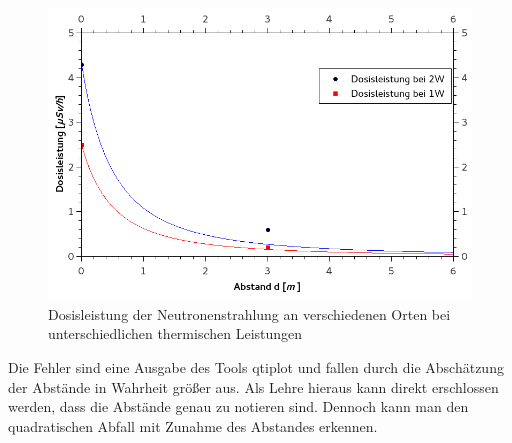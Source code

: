         \begin{figure}
               \centering
               \includegraphics[scale=0.5]{pic/Neutronendosisleistung_Abstand}
               \caption{Dosisleistung der Neutronenstrahlung an verschiedenen Orten bei unterschiedlichen thermischen Leistungen}
               \label{df:neu_abstand}
        \end{figure}
    Die Fehler sind eine Ausgabe des Tools qtiplot und fallen durch die Abschätzung der Abstände in Wahrheit größer aus. Als Lehre hieraus kann direkt erschlossen werden, dass die Abstände genau zu notieren sind.
    Dennoch kann man den quadratischen Abfall mit Zunahme des Abstandes erkennen.
